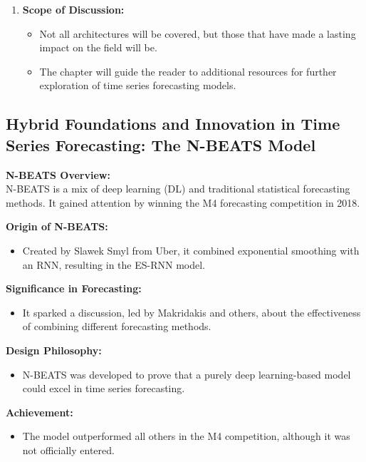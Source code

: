 \documentclass{article}
\begin{document}
\begin{enumerate}
    \item \textbf{Scope of Discussion:}
    \begin{itemize}
        \item Not all architectures will be covered, but those that have made a lasting impact on the field will be.
        \item The chapter will guide the reader to additional resources for further exploration of time series forecasting models.
    \end{itemize}
\end{enumerate}

\subsection{Hybrid Foundations and Innovation in Time Series Forecasting: The N-BEATS Model}

\textbf{N-BEATS Overview:} \\
N-BEATS is a mix of deep learning (DL) and traditional statistical forecasting methods. It gained attention by winning the M4 forecasting competition in 2018.

\textbf{Origin of N-BEATS:} \\
\begin{itemize}
  \item Created by Slawek Smyl from Uber, it combined exponential smoothing with an RNN, resulting in the ES-RNN model.
\end{itemize}

\textbf{Significance in Forecasting:} \\
\begin{itemize}
  \item It sparked a discussion, led by Makridakis and others, about the effectiveness of combining different forecasting methods.
\end{itemize}

\textbf{Design Philosophy:} \\
\begin{itemize}
  \item N-BEATS was developed to prove that a purely deep learning-based model could excel in time series forecasting.
\end{itemize}

\textbf{Achievement:} \\
\begin{itemize}
  \item The model outperformed all others in the M4 competition, although it was not officially entered.
\end{itemize}
\end{document}

